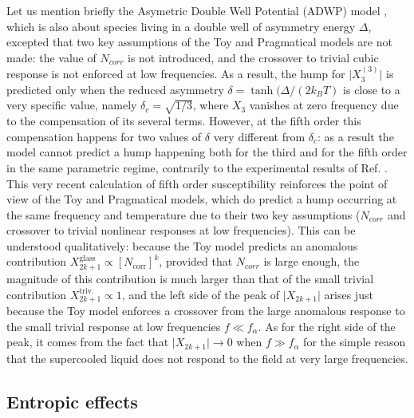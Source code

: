 \documentclass[single column,pre]{revtex4}
\begin{document}
Let us mention briefly the Asymetric Double Well Potential (ADWP) model \cite{Die12}, which is also about species living in a double well of asymmetry energy $\Delta$, excepted that two key assumptions of the Toy and Pragmatical models are not made: the value of $N_{corr}$ is not introduced, and the crossover to trivial cubic response is not enforced at low frequencies. As a result, the hump for $\vert X_3^{(3)} \vert$ is predicted \cite{Die12,Die17} only when the reduced asymmetry $\delta =\tanh(\Delta/(2k_BT)$ is close to a very specific value, namely $\delta_c = \sqrt{1/3}$, where $X_3$ vanishes at zero frequency due to the compensation of its several terms. However, at the fifth order \cite{Die17} this compensation happens for two values of $\delta$ very different from $\delta_c$: as a result the model cannot predict a hump happening both for the third and for the fifth order in the same parametric regime, contrarily to the experimental results of Ref. \cite{Alb16}. This very recent calculation of fifth order susceptibility \cite{Die17} reinforces the point of view of the Toy and Pragmatical models, which do predict a hump occurring at the same frequency and temperature due to their two key assumptions ($N_{corr}$ and crossover to trivial nonlinear responses at low frequencies). This can be understood qualitatively: because the Toy model predicts \cite{Lad12} an anomalous contribution $X_{2k+1}^{\mathrm{glass}} \propto [N_{\text{corr}}]^k$, provided that $N_{corr}$ is large enough, the magnitude of this contribution is much larger than that of the small trivial contribution $X_{2k+1}^{\mathrm{triv.}} \propto 1$, and the left side of the peak of $\vert X_{2k+1} \vert$ arises just because the Toy model enforces a crossover from the large anomalous response to the small trivial response at low frequencies $f \ll f_{\alpha}$. As for the right side of the peak, it comes from the fact that $\vert X_{2k+1} \vert \to 0$ when $f \gg f_{\alpha}$ for the simple reason that the supercooled liquid does not respond to the field at very large frequencies. 

 \subsection{\label{part4-3} Entropic effects}
\end{document}
